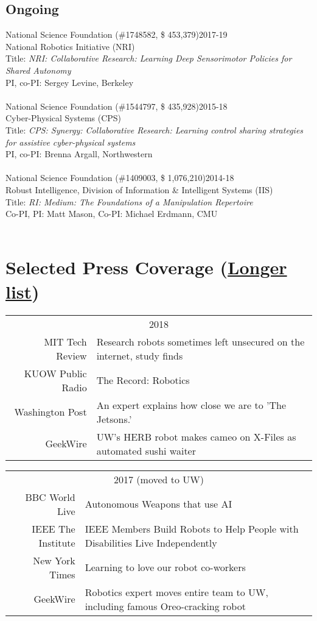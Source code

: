 \documentclass[10pt]{article}
\begin{document}
\subsection{Ongoing}
\noindent
National Science Foundation (\#1748582, \$ 453,379)\hfill 2017-19\\
National Robotics Initiative (NRI)\\
Title: \textit{NRI: Collaborative Research: Learning Deep Sensorimotor Policies for Shared Autonomy}\\
PI, co-PI: Sergey Levine, Berkeley\\
\\
National Science Foundation (\#1544797, \$ 435,928)\hfill 2015-18\\
Cyber-Physical Systems (CPS)\\
Title: \textit{CPS: Synergy: Collaborative Research: Learning control sharing strategies for assistive cyber-physical systems}\\
PI, co-PI: Brenna Argall, Northwestern\\
\\
National Science Foundation (\#1409003, \$ 1,076,210)\hfill 2014-18\\
Robust Intelligence, Division of Information \& Intelligent Systems (IIS)\\
Title: \textit{RI: Medium: The Foundations of a Manipulation Repertoire}\\
Co-PI, PI: Matt Mason, Co-PI: Michael Erdmann, CMU\\
\\


\section{Selected Press Coverage (\href{https://personalrobotics.cs.washington.edu/press/}{Longer list})}
\begin{tabularx}{\linewidth}{rX}
\multicolumn{2}{c}{2018}\\ 
MIT Tech Review & Research robots sometimes left unsecured on the internet, study finds\\
KUOW Public Radio & The Record: Robotics\\
Washington Post & An expert explains how close we are to 'The Jetsons.'\\
GeekWire & UW’s HERB robot makes cameo on X-Files as automated sushi waiter\\
\end{tabularx}
\begin{tabularx}{\linewidth}{rX}
\multicolumn{2}{c}{2017 (moved to UW)}\\ 
BBC World Live & Autonomous Weapons that use AI\\
IEEE The Institute &  IEEE Members Build Robots to Help People with Disabilities Live Independently\\
New York Times & Learning to love our robot co-workers\\
GeekWire & Robotics expert moves entire team to UW, including famous Oreo-cracking robot\\
\end{tabularx}
\newpage


\end{document}

